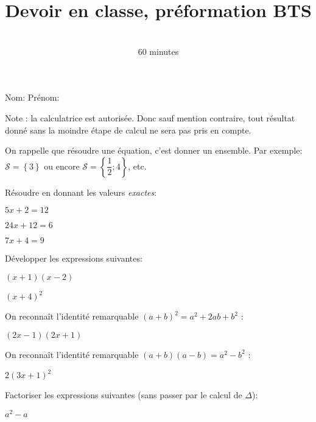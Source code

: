 \documentclass[a4paper,12pt]{scrartcl}
\date{}
\title{Devoir en classe, préformation BTS}
\author{\rotatebox{10}{\textsc{Mathématiques}} \\ 60 minutes}
\begin{document}
\maketitle

{\Large Nom:} 
\hspace{60mm}
{\Large Prénom:}
\vspace{6mm}

Note : la calculatrice est autorisée. Donc sauf mention contraire, tout résultat donné sans la moindre étape de calcul ne sera pas pris en compte.

On rappelle que résoudre une équation, c'est donner un ensemble. Par exemple: $\mathcal{S} = \left\lbrace 3 \right\rbrace$ ou encore $\mathcal{S} = \left\lbrace \dfrac{1}{2} ; 4 \right\rbrace$, etc.


Résoudre en donnant les valeurs \emph{exactes}:

\question{} $5x+2 = 12$


\question{} $24x+12 = 6$


\question{} $7x+4 = 9$



Développer les expressions suivantes:

\question{} $(x+1)(x-2)$


\question{} $(x+4)^{2}$

On reconnaît l'identité remarquable $(a+b)^2 = a^{2} + 2ab + b^{2}$ :


\question{} $(2x-1)(2x+1)$

On reconnaît l'identité remarquable $(a+b)(a-b) = a^{2} - b^{2}$ :


\question{} $2(3x+1)^{2}$



Factoriser les expressions suivantes (sans passer par le calcul de $\Delta$):

\question{} $a^{2} - a$
\end{document}
